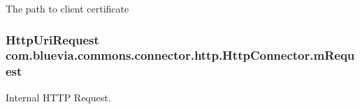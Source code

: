 \label{classcom_1_1bluevia_1_1commons_1_1connector_1_1http_1_1HttpConnector_a69806e8d34342d290c65d66ddd89f992}
The path to client certificate \hypertarget{classcom_1_1bluevia_1_1commons_1_1connector_1_1http_1_1HttpConnector_ae32bdd8e1f3a245661b2388a85b024e4}{
\subsubsection[{mRequest}]{\setlength{\rightskip}{0pt plus 5cm}HttpUriRequest {\bf com.bluevia.commons.connector.http.HttpConnector.mRequest}}}
\label{classcom_1_1bluevia_1_1commons_1_1connector_1_1http_1_1HttpConnector_ae32bdd8e1f3a245661b2388a85b024e4}
Internal HTTP Request. 